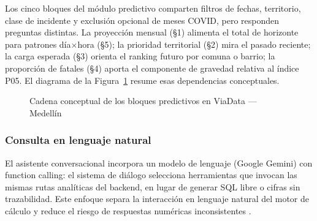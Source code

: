 Los cinco bloques del módulo predictivo comparten filtros de fechas, territorio, clase de incidente y exclusión opcional de meses COVID, pero responden preguntas distintas. La proyección mensual (§1) alimenta el total de horizonte para patrones día$\times$hora (§5); la prioridad territorial (§2) mira el pasado reciente; la carga esperada (§3) orienta el ranking futuro por comuna o barrio; la proporción de fatales (§4) aporta el componente de gravedad relativa al índice P05. El diagrama de la Figura~\ref{fig:cadena-predictiva} resume esas dependencias conceptuales.

\begin{figure}[H]
	\centering
	\caption{Cadena conceptual de los bloques predictivos en ViaData — Medellín}
	\label{fig:cadena-predictiva}
\end{figure}

\subsubsection{Consulta en lenguaje natural}
El asistente conversacional incorpora un modelo de lenguaje (Google Gemini) con function calling: el sistema de diálogo selecciona herramientas que invocan las mismas rutas analíticas del backend, en lugar de generar SQL libre o cifras sin trazabilidad. Este enfoque separa la interacción en lenguaje natural del motor de cálculo y reduce el riesgo de respuestas numéricas inconsistentes \cite{carrillo2024}.


